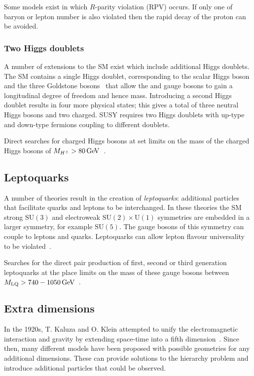 Some models exist in which $R$-parity violation (RPV) occurs. If only one of baryon or lepton number is also violated then the rapid decay of the proton can be avoided. 

\subsubsection{Two Higgs doublets}
A number of extensions to the SM exist which include additional Higgs doublets. The SM contains a single Higgs doublet, corresponding to the scalar Higgs boson and the three Goldstone bosons~\cite{PhysRev.117.648,Goldstone1961} that allow the \Wpm and \Z gauge bosons to gain a longitudinal degree of freedom and hence mass. Introducing a second Higgs doublet results in four more physical states; this gives a total of three neutral Higgs bosons and two charged. 
SUSY requires two Higgs doublets with up-type and down-type fermions coupling to different doublets.   

Direct searches for charged Higgs bosons at \lep set limits on the mass of the charged Higgs bosons of $M_{H^{\pm}} > 80\mathrm{\,Ge\kern -0.1em V}$~\cite{Abbiendi:2013hk}.  

\subsection{Leptoquarks}

A number of theories result in the creation of \emph{leptoquarks}: additional particles that facilitate quarks and leptons to be interchanged. In these theories the SM strong $\text{SU}(3)$ and electroweak $\text{SU}(2)\times\text{U}(1)$ symmetries are embedded in a larger symmetry, for example $\text{SU}(5)$. The gauge bosons of this symmetry can couple to leptons and quarks. Leptoquarks can allow lepton flavour universality to be violated~\cite{PhysRevD.97.015019}. 


Searches for the direct pair production of first, second or third generation leptoquarks at the \lhc place limits on the mass of these gauge bosons between $M_{\text{LQ}} > 740-1050\mathrm{\,Ge\kern -0.1em V}$~\cite{Aad:2015caa,Khachatryan:2014ura}.


\subsection{Extra dimensions}

In the 1920s, T. Kaluza and O. Klein attempted to unify the electromagnetic interaction and gravity by extending space-time into a fifth dimension~\cite{Kaluza:1921tu,Klein1926}. Since then, many different models have been proposed with possible geometries for any additional dimensions. These can provide solutions to the hierarchy problem and introduce additional particles that could be observed. 

